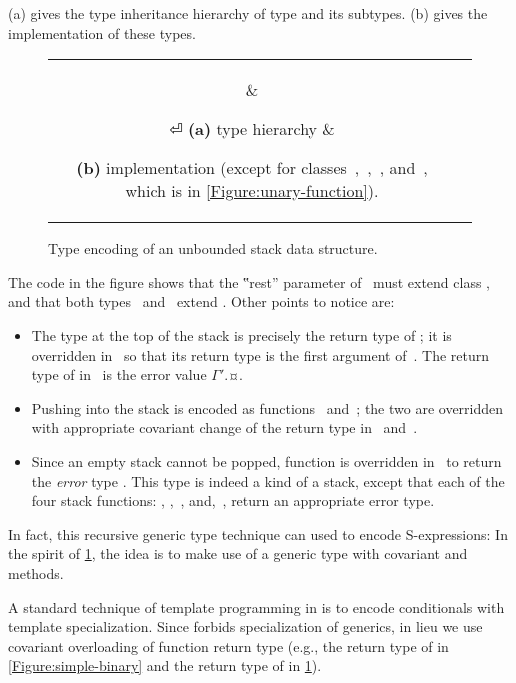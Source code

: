 (a) gives the type inheritance hierarchy 
of type  and its subtypes.
(b)
gives the implementation of these types.

\begin{figure}[!htb]
  \caption{Type encoding of an unbounded stack data structure.}
  \label{Figure:stack-encoding}
  \begin{tabular}{cc}
    \parbox[c]{0.3\linewidth}{%
      
    } &
    \hspace{-3ex} \parbox[c]{63ex}{}⏎
    \textbf{(a)} type hierarchy &
    \hspace{-3ex} \parbox[t]{63ex}{%
    \textbf{(b)} implementation (except
    for classes~,~,~, and~, which is in \cref{Figure:unary-function}).}
  \end{tabular}
\end{figure}

The code in the figure shows that the ‟rest” parameter of~ must extend class ,
  and that both types~ and~ extend .
Other points to notice are:
\begin{itemize}
  \item The type at the top of the stack is precisely the return type of ;
        it is overridden in~ so that its return type is the first argument of~.
        The return type of  in~ is the error value {$Γ'$.¤}.
  \item Pushing into the stack is encoded as functions~ and~;
        the two are overridden with appropriate covariant change of the return type in~ and~.
  \item Since an empty stack cannot be popped, function  is overridden in~ to return
    the \emph{error} type . This type is indeed a kind of a stack, except that each of the four stack
        functions: , ,~, and,~, return an appropriate error type.
\end{itemize}
In fact, this recursive generic type technique can used to encode S-expressions: In the spirit of
  \cref{Figure:stack-encoding}, the idea is to make use of a  generic type
  with covariant  and  methods.

A standard technique of template programming in \CC is to encode conditionals with template specialization.
Since \Java forbids specialization of generics, in lieu we use covariant overloading of function
  return type (e.g., the return type of  in \cref{Figure:simple-binary} and the
  return type of  in \cref{Figure:stack-encoding}).

